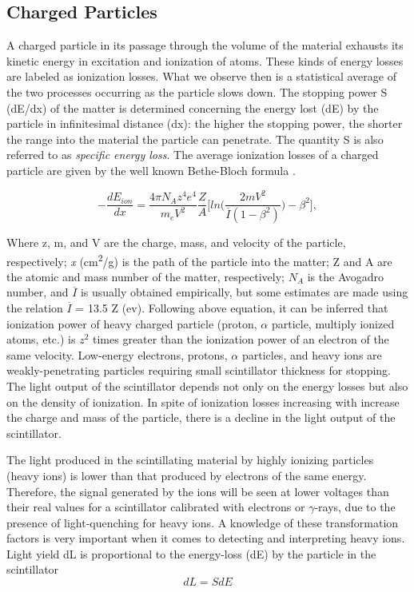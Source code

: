 \documentclass[a4paper,12pt,twoside]{report}
\begin{document}
\subsection{Charged Particles}
A charged particle in its passage through the volume of the material exhausts its kinetic energy in excitation and ionization of atoms. These kinds of energy losses are labeled as ionization losses. What we observe then is a statistical average of the two processes occurring as the particle slows down. The stopping power S (dE/dx) of the matter is determined concerning the energy lost (dE) by the particle in infinitesimal distance (dx): the higher the stopping power, the shorter the range into the material the particle can penetrate. The quantity S is also referred to as \textit{specific energy loss}. The average ionization losses of a charged particle are given by the well known Bethe-Bloch formula \cite{bethebloch}.

\begin{equation}
    -\frac{dE_{ion}}{dx}=\frac{4\pi N_{A} z^{4} e^{4}}{m_{e} V^{2}} \frac{Z}{A} \Bigg[ ln\Bigg(   \frac{2mV^{2}}{\overline{I} (1-\beta^{2})}    \Bigg) -\beta^{2}\Bigg],
\end{equation}


Where z, m, and V are the charge, mass, and velocity of the particle, respectively; \textit{x} (cm\textsuperscript{2}/g) is the path of the particle into the matter; Z and A are the atomic and mass number of the matter, respectively; $N_{A}$ is the Avogadro number, and $\overline{I}$ is usually obtained empirically, but some estimates are made using the relation $\overline{I}$ = 13.5 Z (ev).
\newline
Following above equation, it can be inferred that ionization power of heavy charged particle (proton, $\alpha$ particle, multiply ionized atoms, etc.) is $z^{2}$ times greater than the ionization power of an electron of the same velocity. Low-energy electrons, protons, $\alpha$ particles, and heavy ions are weakly-penetrating particles requiring small scintillator thickness for stopping. The light output of the scintillator depends not only on the energy losses but also on the density of ionization. In spite of ionization losses increasing with increase the charge  and mass of the particle, there is a decline in the light output of the scintillator.

The light produced in the scintillating material by highly ionizing particles (heavy ions) is lower than that produced by electrons of the same energy. Therefore, the signal generated by the ions will be seen at lower voltages than their real values for a scintillator calibrated with electrons or $\gamma$-rays, due to the presence of light-quenching for heavy ions. A knowledge of these transformation factors is very important when it comes to detecting and interpreting heavy ions. 
Light yield dL is proportional to the energy-loss (dE) by the particle in the scintillator
\begin{equation}
    dL = SdE
\end{equation}
\end{document}
